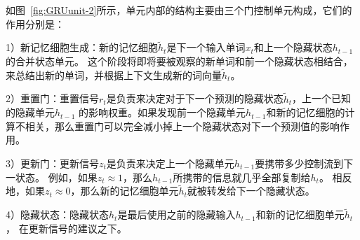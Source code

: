 如图~\ref{fig:GRUunit-2}所示，单元内部的结构主要由三个门控制单元构成，它们的作用分别是：

1）新记忆细胞生成：新的记忆细胞${\widetilde{h}_{t}}$是下一个输入单词${x_{t}}$和上一个隐藏状态${h_{t-1}}$的合并状态单元。
这个阶段将即将要被观察的新单词和前一个隐藏状态相结合，来总结出新的单词，并根据上下文生成新的词向量${\widetilde{h}_{t}}$。

2）重置门：重置信号${r_{t}}$是负责来决定对于下一个预测的隐藏状态${\widetilde{h}_{t}}$，上一个已知的隐藏单元${h_{t-1}}$
的影响权重。如果发现前一个隐藏单元${h_{t-1}}$和新的记忆细胞的计算不相关，那么重置门可以完全减小掉上一个隐藏状态对下一个预测值的影响作用。

3）更新门：更新信号${z_{t}}$是负责来决定上一个隐藏单元${h_{t-1}}$要携带多少控制流到下一状态。
例如，如果${z_{t}\approx1}$，那么${h_{t-1}}$所携带的信息就几乎全部复制给${h_{t}}$。
相反地，如果${z_{t}\approx0}$，那么新的记忆细胞单元${\widetilde{h}_{t}}$就被转发给下一个隐藏状态。

4）隐藏状态：隐藏状态${h_{t}}$是最后使用之前的隐藏输入${h_{t-1}}$和新的记忆细胞单元${\widetilde{h}_{t}}$，
在更新信号的建议之下。


